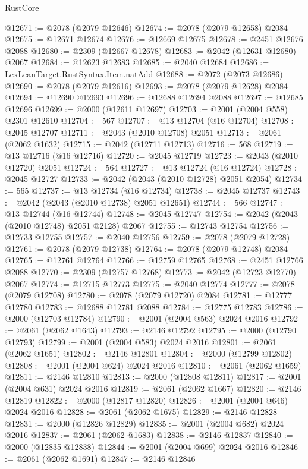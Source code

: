 \begin{lexlean}{RustCore}
\begin{coremodule}
@12671 := @2078 (@2079 @12646)
@12674 := @2078 (@2079 @12658) @2084
@12675 := @12671 @12674
@12676 := @12669 @12675
@12678 := @2451 @12676 @2088
@12680 := @2309 (@12667 @12678)
@12683 := @2042 (@12631 @12680) @2067
@12684 := @12623 @12683
@12685 := @2040 @12684
@12686 := LexLeanTarget.RustSyntax.Item.natAdd
@12688 := @2072 (@2073 @12686)
@12690 := @2078 (@2079 @12616)
@12693 := @2078 (@2079 @12628) @2084
@12694 := @12690 @12693
@12696 := @12688 @12694 @2088
@12697 := @12685 @12696
@12699 := @2000 (@12611 @12697)
@12703 := @2001 (@2004 @558) @2301 @12610
@12704 := 567
@12707 := @13 @12704 (@16 @12704)
@12708 := @2045 @12707
@12711 := @2043 (@2010 @12708) @2051
@12713 := @2061 (@2062 @1632)
@12715 := @2042 (@12711 @12713)
@12716 := 568
@12719 := @13 @12716 (@16 @12716)
@12720 := @2045 @12719
@12723 := @2043 (@2010 @12720) @2051
@12724 := 564
@12727 := @13 @12724 (@16 @12724)
@12728 := @2045 @12727
@12733 := @2042 (@2043 (@2010 @12728) @2051 @2054)
@12734 := 565
@12737 := @13 @12734 (@16 @12734)
@12738 := @2045 @12737
@12743 := @2042 (@2043 (@2010 @12738) @2051 @12651)
@12744 := 566
@12747 := @13 @12744 (@16 @12744)
@12748 := @2045 @12747
@12754 := @2042 (@2043 (@2010 @12748) @2051 @2128) @2067
@12755 := @12743 @12754
@12756 := @12733 @12755
@12757 := @2040 @12756
@12759 := @2078 (@2079 @12728)
@12761 := @2078 (@2079 @12738)
@12764 := @2078 (@2079 @12748) @2084
@12765 := @12761 @12764
@12766 := @12759 @12765
@12768 := @2451 @12766 @2088
@12770 := @2309 (@12757 @12768)
@12773 := @2042 (@12723 @12770) @2067
@12774 := @12715 @12773
@12775 := @2040 @12774
@12777 := @2078 (@2079 @12708)
@12780 := @2078 (@2079 @12720) @2084
@12781 := @12777 @12780
@12783 := @12688 @12781 @2088
@12784 := @12775 @12783
@12786 := @2000 (@12703 @12784)
@12790 := @2001 (@2004 @563) @2024 @2016
@12792 := @2061 (@2062 @1643)
@12793 := @2146 @12792
@12795 := @2000 (@12790 @12793)
@12799 := @2001 (@2004 @583) @2024 @2016
@12801 := @2061 (@2062 @1651)
@12802 := @2146 @12801
@12804 := @2000 (@12799 @12802)
@12808 := @2001 (@2004 @624) @2024 @2016
@12810 := @2061 (@2062 @1659)
@12811 := @2146 @12810
@12813 := @2000 (@12808 @12811)
@12817 := @2001 (@2004 @631) @2024 @2016
@12819 := @2061 (@2062 @1667)
@12820 := @2146 @12819
@12822 := @2000 (@12817 @12820)
@12826 := @2001 (@2004 @646) @2024 @2016
@12828 := @2061 (@2062 @1675)
@12829 := @2146 @12828
@12831 := @2000 (@12826 @12829)
@12835 := @2001 (@2004 @682) @2024 @2016
@12837 := @2061 (@2062 @1683)
@12838 := @2146 @12837
@12840 := @2000 (@12835 @12838)
@12844 := @2001 (@2004 @699) @2024 @2016
@12846 := @2061 (@2062 @1691)
@12847 := @2146 @12846

\end{coremodule}
\end{lexlean}

